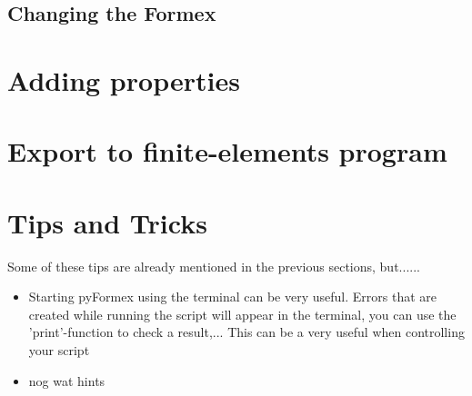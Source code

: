 \documentclass[a4paper]{manual}
\newcommand{\pyformex}{pyFormex\xspace}
\begin{document}
{\subsection{Changing the Formex}
\label{subsec:changing}






%
\section{Adding properties}
\label{sec:props}


%
\section{Export to finite-elements program}


%
\section{Tips and Tricks}

Some of these tips are already mentioned in the previous sections, but......
\begin{itemize}
\item Starting \pyformex using the terminal can be very useful. Errors that are created while running the script will appear in the terminal, you can use the 'print'-function to check a result,... This can be a very useful when controlling your script
\item nog wat hints 
\end{itemize}





}
\end{document}
